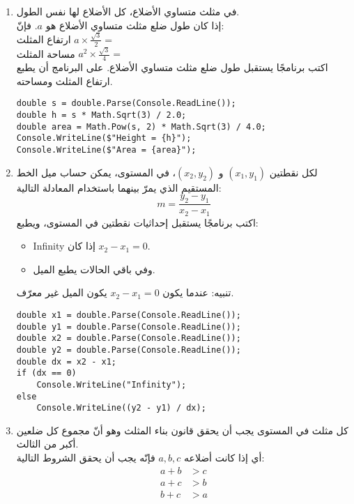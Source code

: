 ﻿\documentclass[12pt]{article}
\begin{document}
\begin{enumerate}[itemsep=2em]
\item
في مثلث متساوي الأضلاع، كل الأضلاع لها نفس الطول.\\
إذا كان طول ضلع مثلث متساوي الأضلاع هو $a$. فإنّ: \\
ارتفاع المثلث $a \times \frac{\sqrt{3}}{2} =$\\
مساحة المثلث $a^2 \times \frac{\sqrt{3}}{4} =$\\
اكتب برنامجًا يستقبل طول ضلع مثلث متساوي الأضلاع.
على البرنامج أن يطبع ارتفاع المثلث ومساحته.

\ifwithsols
\begin{boxSolution}
\begin{english}
\begin{verbatim}
double s = double.Parse(Console.ReadLine());
double h = s * Math.Sqrt(3) / 2.0;
double area = Math.Pow(s, 2) * Math.Sqrt(3) / 4.0;
Console.WriteLine($"Height = {h}");
Console.WriteLine($"Area = {area}");
\end{verbatim}
\end{english}
\end{boxSolution}
\fi


\item
لكل نقطتين $(x_1,y_1)$ و $(x_2,y_2)$، في المستوى، يمكن حساب ميل الخط المستقيم الذي يمرّ بينهما باستخدام المعادلة التالية:
\[ m = \frac{y_2 - y_1}{x_2 - x_1} \]
اكتب برنامجًا يستقبل إحداثيات نقطتين في المستوى، ويطبع:
\begin{itemize}
\item    \textenglish{Infinity} إذا كان \(x_2 - x_1 = 0\). \\
\item    وفي باقي الحالات يطبع الميل.
\end{itemize}

\ifwithsols
\begin{boxSolution}
تنبيه: عندما يكون \(x_2 - x_1 = 0\) يكون الميل غير معرّف.
\begin{english}
\begin{verbatim}
double x1 = double.Parse(Console.ReadLine());
double y1 = double.Parse(Console.ReadLine());
double x2 = double.Parse(Console.ReadLine());
double y2 = double.Parse(Console.ReadLine());
double dx = x2 - x1;
if (dx == 0)
    Console.WriteLine("Infinity");
else
    Console.WriteLine((y2 - y1) / dx);
\end{verbatim}
\end{english}
\end{boxSolution}
\fi


\item
كل مثلث في المستوى يجب أن يحقق قانون بناء المثلث وهو أنّ مجموع كل ضلعين أكبر من الثالث. \\
 أي إذا كانت أضلاعه $a, b, c$ فإنّه يجب أن يحقق الشروط التالية:
\begin{align*}
a + b &> c \\
a + c &> b \\
b + c &> a
\end{align*}


\end{enumerate}
\end{document}
